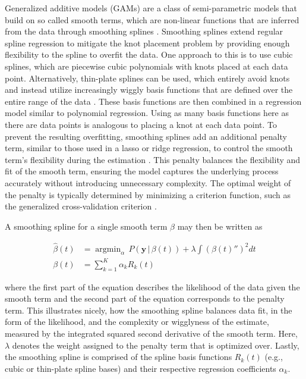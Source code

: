 \documentclass[man, floatsintext]{apa7}
\DeclareMathOperator*{\argmin}{argmin}
\begin{document}
Generalized additive models (GAMs) are a class of semi-parametric models that
build on so called smooth terms, which are non-linear functions that are
inferred from the data through smoothing splines
\parencite{wood_generalized_2006, wood_inference_2020,
  hastie_generalized_1999}. Smoothing splines extend regular spline regression
to
mitigate the knot placement problem by providing enough flexibility to the
spline to overfit the data. One approach to this is to use cubic splines, which
are piecewise cubic polynomials with knots placed at each data point.
Alternatively, thin-plate splines can be used, which entirely avoid knots and
instead utilize increasingly wiggly basis functions that are defined over the
entire range of the data \parencite{wood_thin_2003}. These basis functions are
then combined in a regression model similar to polynomial regression. Using as
many basis functions here as there are data points is analogous to placing a
knot at each data point. To prevent the resulting overfitting, smoothing
splines add an additional penalty term, similar to those used in a lasso or
ridge regression, to control the smooth term's flexibility during the
estimation \parencite{gu_smoothing_2013, wahba_spline_1980}. This penalty
balances the flexibility and fit of the smooth term, ensuring the model
captures the underlying process accurately without introducing unnecessary
complexity. The optimal weight of the penalty is typically determined by
minimizing a criterion function, such as the generalized cross-validation
criterion \parencite{wood_generalized_2006, golub_generalized_1997}.

A smoothing spline for a single smooth term $\beta$ may then be written as

\begin{equation}
  \begin{aligned}
    \hat{\beta}(t) & = \argmin_\alpha \, P(\textbf{y} \, | \, \beta(t)) +
    \lambda \int {(\beta(t)'')}^2 dt                                      \\
    \beta(t)       & = \sum^K_{k = 1} \alpha_k R_k(t)
  \end{aligned}
\end{equation}

\noindent where the first part of the equation describes the likelihood
of the data given the smooth term and the second part of the equation
corresponds to the penalty term. This illustrates nicely, how the smoothing
spline balances data fit, in the form of the likelihood, and the complexity or
wigglyness of the estimate, measured by the integrated squared second
derivative of the smooth term. Here, $\lambda$ denotes the weight assigned to
the penalty term that is optimized over. Lastly, the smoothing spline is
comprised of the spline basis functions $R_k(t)$ (e.g., cubic or thin-plate
spline bases) and their respective regression coefficients $\alpha_k$.
\end{document}
